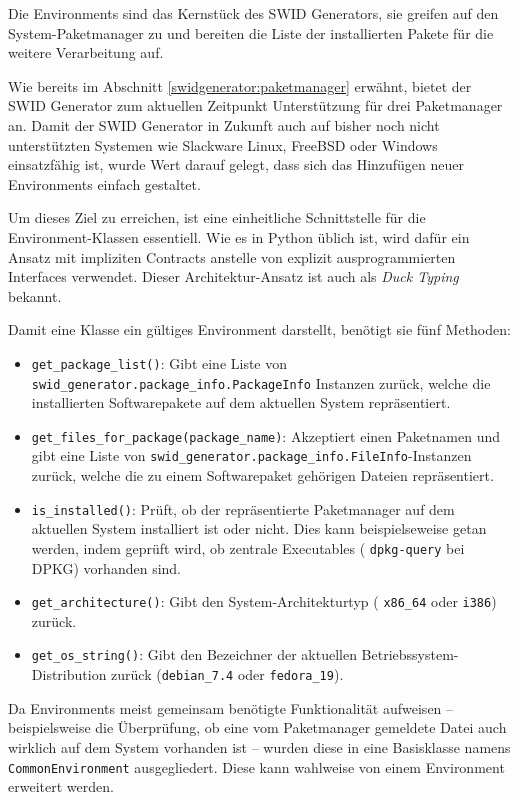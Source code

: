 Die Environments sind das Kernstück des SWID Generators, sie greifen auf
den System-Paketmanager zu und bereiten die Liste der installierten Pakete für
die weitere Verarbeitung auf.

Wie bereits im Abschnitt \ref{swidgenerator:paketmanager} erwähnt, bietet der
SWID Generator zum aktuellen Zeitpunkt Unterstützung für drei Paketmanager an.
Damit der SWID Generator in Zukunft auch auf bisher noch nicht unterstützten
Systemen wie Slackware Linux, FreeBSD oder Windows einsatzfähig ist, wurde Wert
darauf gelegt, dass sich das Hinzufügen neuer Environments einfach gestaltet.

Um dieses Ziel zu erreichen, ist eine einheitliche Schnittstelle für die
Environment-Klassen essentiell. Wie es in Python üblich
ist\cite{contracts:2003}, wird dafür ein Ansatz mit impliziten Contracts
anstelle von explizit ausprogrammierten Interfaces verwendet. Dieser
Architektur-Ansatz ist auch als \textit{Duck Typing} bekannt.

Damit eine Klasse ein gültiges Environment darstellt, benötigt sie 
fünf Methoden:

\begin{itemize}
	\item \texttt{get\_package\_list()}: Gibt eine Liste von
		\texttt{swid\_generator.\-package\_info.\-PackageInfo} Instanzen zurück,
		welche die installierten Softwarepakete auf dem aktuellen System
		repräsentiert.
	\item \texttt{get\_files\_for\_package(package\_name)}: Akzeptiert einen
		Paketnamen und gibt eine Liste von
		\texttt{swid\_generator.\-package\_info.\-FileInfo}-Instanzen zurück, welche
		die zu einem Softwarepaket gehörigen Dateien repräsentiert.
	\item \texttt{is\_installed()}: Prüft, ob der repräsentierte Paketmanager auf
		dem aktuellen System installiert ist oder nicht. Dies kann beispielseweise
		getan werden, indem geprüft wird, ob zentrale Executables (\zb
		\texttt{dpkg-query} bei DPKG) vorhanden sind.
	\item \texttt{get\_architecture()}: Gibt den System-Architekturtyp (\zb
		\texttt{x86\_64} oder \texttt{i386}) zurück.
	\item \texttt{get\_os\_string()}: Gibt den Bezeichner der aktuellen
		Betriebssystem-Distribution zurück (\zb \texttt{debian\_7.4} oder
		\texttt{fedora\_19}).
\end{itemize}

Da Environments meist gemeinsam benötigte Funktionalität aufweisen --
beispielsweise die Überprüfung, ob eine vom Paketmanager gemeldete Datei auch
wirklich auf dem System vorhanden ist -- wurden diese in eine Basisklasse namens
\texttt{CommonEnvironment} ausgegliedert. Diese kann wahlweise von einem
Environment erweitert werden.

